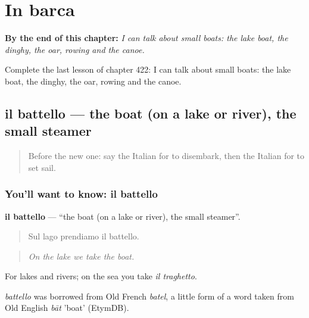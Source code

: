 
\chapter{In barca}
\label{ch:it-in-barca}

\begin{chapteropening}
\textbf{By the end of this chapter:} \emph{I can talk about small boats: the lake boat, the dinghy, the oar, rowing and the canoe.}

Complete the last lesson of chapter 422: I can talk about small boats: the lake boat, the dinghy, the oar, rowing and the canoe.
\end{chapteropening}

\section[il battello]{il battello — the boat (on a lake or river), the small steamer}

\label{lesson:IT-C422-battello}



\begin{quote}
Before the new one: say the Italian for to disembark, then the Italian for to set sail.
\end{quote}

\subsection*{You'll want to know: il battello}
\textbf{il battello} — \textquotedblleft{}the boat (on a lake or river), the small steamer\textquotedblright{}.

\begin{quote}
Sul lago prendiamo il battello.
\end{quote}

\begin{quote}
\emph{On the lake we take the boat.}
\end{quote}

For lakes and rivers; on the sea you take \emph{il traghetto}.

\begin{cousinweb}
\emph{battello} was borrowed from Old French \emph{batel}, a little form of a word taken from Old English \emph{bāt} 'boat' (EtymDB).
\end{cousinweb}

